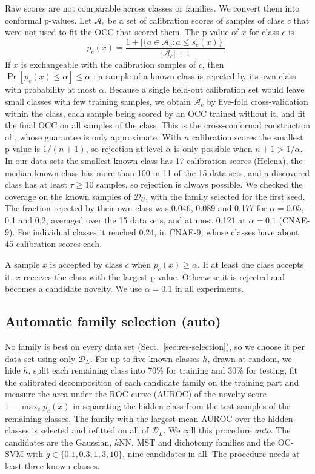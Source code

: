 \documentclass[pdflatex,sn-basic]{sn-jnl}
\newcommand{\DL}{\mathcal{D}_L}
\newcommand{\DU}{\mathcal{D}_U}
\begin{document}
Raw scores are not comparable across classes or families. We convert them into conformal p-values. Let $\mathcal{A}_c$ be a set of calibration scores of samples of class $c$ that were not used to fit the OCC that scored them. The p-value of $x$ for class $c$ is
\begin{equation}
p_c(x) = \frac{1 + |\{a \in \mathcal{A}_c : a \le s_c(x)\}|}{|\mathcal{A}_c| + 1}.
\label{eq:pvalue}
\end{equation}
If $x$ is exchangeable with the calibration samples of $c$, then $\Pr[p_c(x) \le \alpha] \le \alpha$ \citep{vovk2005alrw,bates2023conformal}: a sample of a known class is rejected by its own class with probability at most $\alpha$. Because a single held-out calibration set would leave small classes with few training samples, we obtain $\mathcal{A}_c$ by five-fold cross-validation within the class, each sample being scored by an OCC trained without it, and fit the final OCC on all samples of the class. This is the cross-conformal construction of \citet{vovk2015crossconformal}, whose guarantee is only approximate. With $n$ calibration scores the smallest p-value is $1/(n+1)$, so rejection at level $\alpha$ is only possible when $n + 1 > 1/\alpha$. In our data sets the smallest known class has 17 calibration scores (Helena), the median known class has more than 100 in 11 of the 15 data sets, and a discovered class has at least $\tau \ge 10$ samples, so rejection is always possible. We checked the coverage on the known samples of $\DU$, with the family selected for the first seed. The fraction rejected by their own class was 0.046, 0.089 and 0.177 for $\alpha = 0.05$, 0.1 and 0.2, averaged over the 15 data sets, and at most 0.121 at $\alpha = 0.1$ (CNAE-9). For individual classes it reached 0.24, in CNAE-9, whose classes have about 45 calibration scores each.

A sample $x$ is accepted by class $c$ when $p_c(x) \ge \alpha$. If at least one class accepts it, $x$ receives the class with the largest p-value. Otherwise it is rejected and becomes a candidate novelty. We use $\alpha = 0.1$ in all experiments.

\subsection{Automatic family selection (auto)}\label{sec:selection}

No family is best on every data set (Sect.~\ref{sec:res-selection}), so we choose it per data set using only $\DL$. For up to five known classes $h$, drawn at random, we hide $h$, split each remaining class into 70\% for training and 30\% for testing, fit the calibrated decomposition of each candidate family on the training part and measure the area under the ROC curve (AUROC) of the novelty score $1-\max_c p_c(x)$ in separating the hidden class from the test samples of the remaining classes. The family with the largest mean AUROC over the hidden classes is selected and refitted on all of $\DL$. We call this procedure \emph{auto}. The candidates are the Gaussian, $k$NN, MST and dichotomy families and the OC-SVM with $g \in \{0.1, 0.3, 1, 3, 10\}$, nine candidates in all. The procedure needs at least three known classes.
\end{document}
